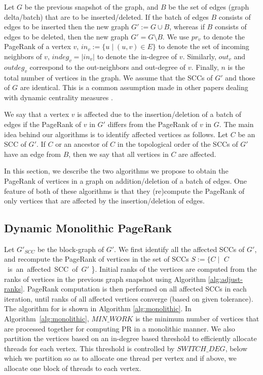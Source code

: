 Let $G$ be the previous snapshot of the graph, and $B$ be the set of edges (graph delta/batch) that are to be inserted/deleted. If the batch of edges $B$ consists of edges to be inserted then the new graph $G' := G \cup B$, whereas if $B$ consists of edges to be deleted, then the new graph $G' = G \setminus B$. We use $pr_v$ to denote the PageRank of a vertex $v$, $in_v := \{u \mid (u, v) \in E\}$ to denote the set of incoming neighbors of $v$,  $indeg_v = |in_v|$ to denote the in-degree of $v$. Similarly, $out_v$ and $outdeg_v$ correspond to the out-neighbors and out-degree of $v$. Finally, $n$ is the total number of vertices in the graph. We assume that the SCCs of $G'$ and those of $G$ are identical. This is a common assumption made in other papers dealing with dynamic centrality measures \cite{cent-shukla20,jamour,cc-mccoll13,ipdps22}.

We say that a vertex $v$ is affected due to the insertion/deletion of a batch of edges if the PageRank of $v$ in $G'$ differs from the PageRank of $v$ in $G$. The main idea behind our algorithms is to identify affected vertices as follows. Let $C$ be an SCC of $G'$. If $C$ or an ancestor of $C$ in the topological order of the SCCs of $G'$ have an edge from $B$, then we say that all vertices in $C$ are affected.

In this section, we describe the two algorithms we propose to obtain the PageRank of vertices in a graph on addition/deletion of a batch of edges. One feature of both of these algorithms is that they (re)compute the PageRank of only vertices that are affected by the insertion/deletion of edges.




\subsection{Dynamic Monolithic PageRank}

Let $G'_{SCC}$ be the block-graph of $G'$. We first identify all the affected SCCs of $G'$, and recompute the PageRank of vertices in the set of SCCs $S := \{C \mid $ \mbox{$C$ is an affected SCC of $G'$} \}. Initial ranks of the vertices are computed from the ranks of vertices in the previous graph snapshot using Algorithm \ref{alg:adjust-ranks}. PageRank computation is then performed on all affected SCCs in each iteration, until ranks of all affected vertices converge (based on given tolerance). The algorithm for \monolithicPR{} is shown in Algorithm \ref{alg:monolithic}. In Algorithm~\ref{alg:monolithic}, $MIN\_WORK$ is the minimum number of vertices that are processed together for computing PR in a monolithic manner. We also partition the vertices based on an in-degree based threshold to efficiently allocate threads for each vertex. This threshold is controlled by $SWITCH\_DEG$, below which we partition so as to allocate one thread per vertex and if above, we allocate one block of threads to each vertex.

